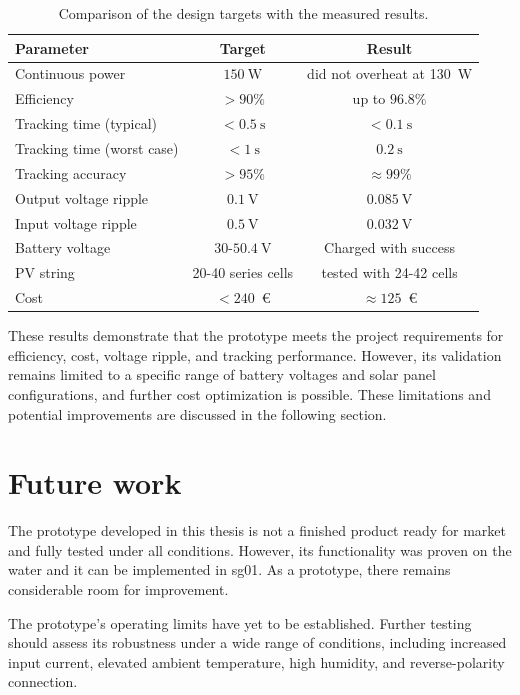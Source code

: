 \begin{table}[!ht]
    \centering
    \caption{Comparison of the design targets with the measured results.}
    \label{tab:targets-vs-results}
    \begin{tabular}{lcc}
        \toprule
        Parameter & Target & Result \\
        \midrule
        Continuous power & \(150~\mathrm{W}\) & did not overheat at 130~W \\
        Efficiency & \(> 90\%\) & up to \(96.8\%\) \\
        Tracking time (typical) & \(< 0.5~\mathrm{s}\) & \(< 0.1~\mathrm{s}\) \\
        Tracking time (worst case) & \(< 1~\mathrm{s}\) & \(0.2~\mathrm{s}\) \\
        Tracking accuracy & \(> 95\%\) & \(\approx 99\%\) \\
        Output voltage ripple & \(0.1~\mathrm{V}\) & \(0.085~\mathrm{V}\) \\
        Input voltage ripple & \(0.5~\mathrm{V}\) & \(0.032~\mathrm{V}\) \\
        Battery voltage & \(30\)-\(50.4~\mathrm{V}\) & Charged with success \\
        PV string & 20-40 series cells & tested with 24-42 cells \\
        Cost & \(< 240\)~€ & \(\approx 125\)~€ \\
        \bottomrule
    \end{tabular}
\end{table}

These results demonstrate that the prototype meets the project requirements for efficiency, cost, voltage ripple, and tracking performance. However, its validation remains limited to a specific range of battery voltages and solar panel configurations, and further cost optimization is possible. These limitations and potential improvements are discussed in the following section.

\section{Future work}

The prototype developed in this thesis is not a finished product ready for market and fully tested under all conditions. However, its functionality was proven on the water and it can be implemented in \ac{sg01}. As a prototype, there remains considerable room for improvement.

The prototype's operating limits have yet to be established. Further testing should assess its robustness under a wide range of conditions, including increased input current, elevated ambient temperature, high humidity, and reverse-polarity connection.

